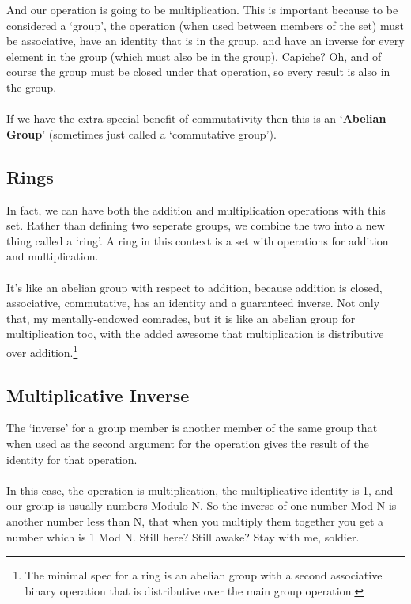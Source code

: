     And our operation is going to be multiplication. This is important because to be considered a `group', the operation (when used between members of the set) must be associative, have an identity that is in the group, and have an inverse for every element in the group (which must also be in the group). Capiche? Oh, and of course the group must be closed under that operation, so every result is also in the group.\\
    \\
    If we have the extra special benefit of commutativity then this is an `\textbf{Abelian Group}' (sometimes just called a `commutative group').

    \subsection{Rings}
    In fact, we can have both the addition and multiplication operations with this set. Rather than defining two seperate groups, we combine the two into a new thing called a `ring'.
    A ring in this context is a set with operations for addition and multiplication.\\
    \\
    It's like an abelian group with respect to addition, because addition is closed, associative, commutative, has an identity and a guaranteed inverse. Not only that, my mentally-endowed comrades, but it is like an abelian group for multiplication too, with the added awesome that multiplication is distributive over addition.\footnote{The minimal spec for a ring is an abelian group with a second associative binary operation that is distributive over the main group operation.}

    \subsection{Multiplicative Inverse}
    The `inverse' for a group member is another member of the same group that when used as the second argument for the operation gives the result of the identity for that operation.\\
    \\
    In this case, the operation is multiplication, the multiplicative identity is 1, and our group is usually numbers Modulo N. So the inverse of one number Mod N is another number less than N, that when you multiply them together you get a number which is 1 Mod N. Still here? Still awake? Stay with me, soldier.
    
